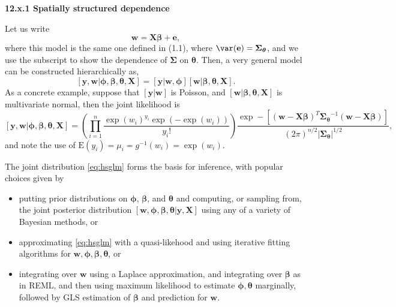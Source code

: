 \documentclass[12pt, titlepage]{article}
\begin{document}
{\large \flushleft \textbf{12.x.1 Spatially structured dependence}}

Let us write
$$
\mathbf{w} = \mathbf{X}\boldsymbol{\beta} + \mathbf{e},
$$
where this model is the same one defined in (1.1), where $\var(\mathbf{e}) = \boldsymbol{\Sigma}_{\boldsymbol{\theta}}$, and we use the subscript to show the dependence of $\boldsymbol{\Sigma}$ on $\boldsymbol{\theta}$. Then, a very general model can be constructed hierarchically as,
\begin{equation} \label{eq:hsglm}
[\mathbf{y},\mathbf{w}|\boldsymbol{\phi},\boldsymbol{\beta},\boldsymbol{\theta},\mathbf{X}] = [\mathbf{y}|\mathbf{w},\boldsymbol{\phi}][\mathbf{w}|\boldsymbol{\beta},\boldsymbol{\theta},\mathbf{X}].
\end{equation}
As a concrete example, suppose that $[\mathbf{y}|\mathbf{w}]$ is Poisson, and $[\mathbf{w}|\boldsymbol{\beta},\boldsymbol{\theta},\mathbf{X}]$ is multivariate normal, then the joint likelihood is
$$
[\mathbf{y},\mathbf{w}|\boldsymbol{\phi},\boldsymbol{\beta},\boldsymbol{\theta},\mathbf{X}] = \left(\prod_{i=1}^{n}\frac{\exp(w_{i})^{y_{i}}\exp(-\exp(w_i))}{y_{i}!}\right)\frac{\exp-[(\mathbf{w} - \mathbf{X}\boldsymbol{\beta})^{T}\boldsymbol{\Sigma_{\boldsymbol{\theta}}}^{-1}(\mathbf{w} - \mathbf{X}\boldsymbol{\beta})]}{(2\pi)^{n/2}|\boldsymbol{\Sigma_{\boldsymbol{\theta}}}|^{1/2}},
$$
and note the use of $\textrm{E}(y_{i}) = \mu_{i} = g^{-1}(w_{i}) = \exp(w_{i})$.

The joint distribution \ref{eq:hsglm} forms the basis for inference, with popular choices given by
\begin{itemize}
\item putting prior distributions on $\boldsymbol{\phi}$, $\boldsymbol{\beta}$, and $\boldsymbol{\theta}$ and computing, or sampling from, the joint posterior distribution $[\mathbf{w},\boldsymbol{\phi},\boldsymbol{\beta},\boldsymbol{\theta}|\mathbf{y},\mathbf{X}]$ using any of a variety of Bayesian methods, or 
\item approximating \eqref{eq:hsglm} with a quasi-likehood and using iterative fitting algorithms for $\mathbf{w},\boldsymbol{\phi},\boldsymbol{\beta},\boldsymbol{\theta}$, or
\item integrating over $\mathbf{w}$ using a Laplace approximation, and integrating over $\boldsymbol{\beta}$ as in REML, and then using maximum likelihood to estimate $\boldsymbol{\phi},\boldsymbol{\theta}$ marginally, followed by GLS estimation of $\boldsymbol{\beta}$ and prediction for $\mathbf{w}$.
\end{itemize}
\end{document}
